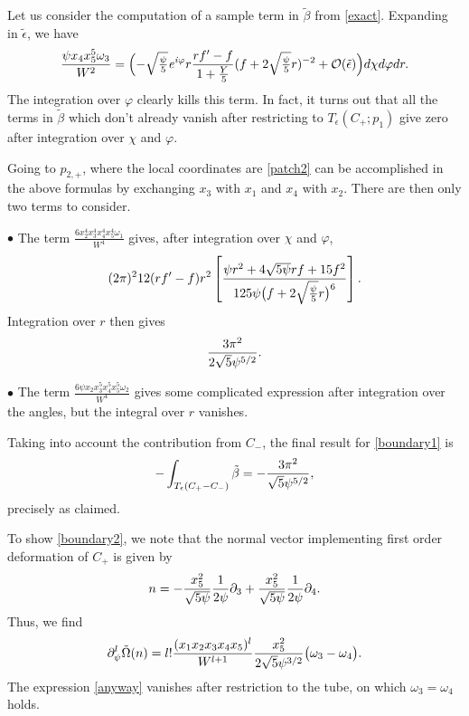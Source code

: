 Let us consider the computation of a sample term in $\tilde\beta$ from
\eqref{exact}. Expanding in $\tilde\epsilon$, we have
\begin{equation}
\frac{\psi x_4 x_5^5\omega_3}{W^2} = 
\Bigl(
-{\textstyle\sqrt{\frac{\psi}{5}}} {\it e}^{{\it i}\varphi} r \frac{r f' -  f}{1+\frac Y5}
(f+2{\textstyle\sqrt{\frac{\psi}{5}}} r)^{-2}+{\cal O}(\tilde\epsilon)\Bigr) d\chi d\varphi dr .
\end{equation}
The integration over $\varphi$ clearly kills this term. In fact, it
turns out that all the terms in $\tilde\beta$ which don't already vanish 
after restricting to $T_\epsilon(C_+;p_1)$ give zero after 
integration over $\chi$ and $\varphi$.

Going to $p_{2,+}$, where the local coordinates are \eqref{patch2} can be 
accomplished in the above formulas by exchanging $x_3$ with $x_1$ and $x_4$ 
with $x_2$. There are then only two terms to consider.

$\bullet$ The term $\frac{6 x_2^4x_3^4x_4^4x_5^4\omega_1}{W^4}$ gives, after 
integration over $\chi$ and $\varphi$,
\begin{equation}
(2\pi)^2 12 (rf'-f) r^2\left[\frac{\psi r^2 + 4\sqrt{5\psi} r f + 15 f^2}
{125\psi\bigl(f+2{\textstyle\sqrt{\frac{\psi}{5}}} r\bigr)^6}\right] .
\end{equation}
Integration over $r$ then gives
\begin{equation}
\eqlabel{yeah}
\frac{3\pi^2}{2\sqrt{5}\psi^{5/2}} .
\end{equation}

$\bullet$ The term $\frac{6\psi x_2 x_3^5x_4^5x_5^5\omega_2}{W^4}$ gives 
some complicated expression after integration over the angles, but the
integral over $r$ vanishes.

Taking into account the contribution from $C_-$, the final result 
for \eqref{boundary1} is
\begin{equation}
\eqlabel{together}
-\int_{T_\epsilon(C_+-C_-)} \tilde\beta = -\frac{3\pi^2}{\sqrt{5}\psi^{5/2}} ,
\end{equation}
precisely as claimed.

To show \eqref{boundary2}, we note that the normal vector implementing
first order deformation of $C_+$ is given by
\begin{equation}
n = -\frac{x_5^2}{\sqrt{5\psi}}\frac{1}{2\psi} \partial_3 + 
\frac{x_5^2}{\sqrt{5\psi}}\frac{1}{2\psi}\partial_4 .
\end{equation}
Thus, we find
\begin{equation}
\eqlabel{anyway}
\del_\psi^l\tilde\Omega(n) =
l!\frac{(x_1x_2x_3x_4x_5)^l}{W^{l+1}}\frac{x_5^2}{2\sqrt{5}\psi^{3/2}}
\bigl(\omega_3-\omega_4\bigr) .
\end{equation}
The expression \eqref{anyway} vanishes after restriction to the
tube, on which $\omega_3=\omega_4$ holds.


